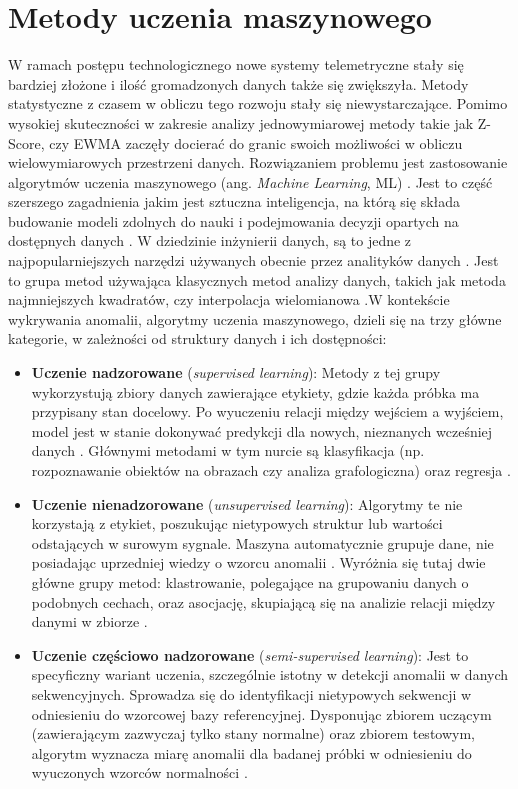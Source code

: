 \documentclass[a4paper,twoside,12pt]{book}
\newcommand{\obcy}[1]{\emph{#1}}
\newcommand{\english}[1]{{\selectlanguage{british}\obcy{#1}}}
\begin{document}
	\section{Metody uczenia maszynowego}
	W ramach postępu technologicznego nowe systemy telemetryczne stały się bardziej złożone i ilość gromadzonych danych także się zwiększyła. Metody statystyczne z czasem w obliczu tego rozwoju stały się niewystarczające. Pomimo wysokiej skuteczności w zakresie analizy jednowymiarowej metody takie jak Z-Score, czy EWMA zaczęły docierać do granic swoich możliwości w obliczu wielowymiarowych przestrzeni danych. Rozwiązaniem problemu jest zastosowanie algorytmów uczenia maszynowego (ang. \english{Machine Learning}, ML) . Jest to część szerszego zagadnienia jakim jest sztuczna inteligencja, na którą się składa budowanie modeli zdolnych do nauki i podejmowania decyzji opartych na dostępnych danych \cite{kufel2023machine}. W dziedzinie inżynierii danych, są to jedne z najpopularniejszych narzędzi używanych obecnie przez analityków danych \cite{lenart2024comparison}. Jest to grupa metod używająca klasycznych metod analizy danych, takich jak metoda najmniejszych kwadratów, czy interpolacja wielomianowa .W kontekście wykrywania anomalii, algorytmy uczenia maszynowego, dzieli się na trzy główne kategorie, w zależności od struktury danych i ich dostępności:  
	\begin{itemize}
		\item \textbf{Uczenie nadzorowane} (\textit{supervised learning}): Metody z tej grupy wykorzystują zbiory danych zawierające etykiety, gdzie każda próbka ma przypisany stan docelowy. Po wyuczeniu relacji między wejściem a wyjściem, model jest w stanie dokonywać predykcji dla nowych, nieznanych wcześniej danych \cite{kufel2023machine}. Głównymi metodami w tym nurcie są klasyfikacja (np. rozpoznawanie obiektów na obrazach czy analiza grafologiczna) oraz regresja \cite{kufel2023machine}.
		
		\item \textbf{Uczenie nienadzorowane} (\textit{unsupervised learning}): Algorytmy te nie korzystają z etykiet, poszukując nietypowych struktur lub wartości odstających w surowym sygnale. Maszyna automatycznie grupuje dane, nie posiadając uprzedniej wiedzy o wzorcu anomalii \cite{kufel2023machine}. Wyróżnia się tutaj dwie główne grupy metod: klastrowanie, polegające na grupowaniu danych o podobnych cechach, oraz asocjację, skupiającą się na analizie relacji między danymi w zbiorze \cite{kufel2023machine}.
		
		\item \textbf{Uczenie częściowo nadzorowane} (\textit{semi-supervised learning}): Jest to specyficzny wariant uczenia, szczególnie istotny w detekcji anomalii w danych sekwencyjnych. Sprowadza się do identyfikacji nietypowych sekwencji w odniesieniu do wzorcowej bazy referencyjnej. Dysponując zbiorem uczącym (zawierającym zazwyczaj tylko stany normalne) oraz zbiorem testowym, algorytm wyznacza miarę anomalii dla badanej próbki w odniesieniu do wyuczonych wzorców normalności \cite{chandola2009anomaly2}.
	\end{itemize}
\end{document}
